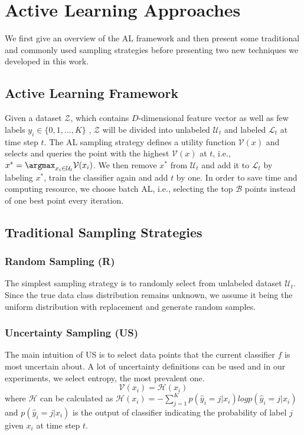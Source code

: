 \section{Active Learning Approaches}
\label{sec:approach}
We first give an overview of the AL framework and then present some 
traditional and commonly used sampling strategies before presenting 
two new techniques we developed in this work. 

\subsection{Active Learning Framework}
Given a dataset $ \mathcal{Z}$, which contains $D$-dimensional feature vector as well as few labels $y_i \in \{0,1,...,K\}$ , 
$\mathcal{Z}$ will be divided into unlabeled $\mathcal{U}_t$ and 
labeled $\mathcal{L}_t$ at time step $t$. 
The AL sampling strategy defines a utility function $\mathcal{V}(x)$ and selects and queries 
the point with the highest $\mathcal{V}(x)$ at $t$, i.e., $x^*=\argmax_{x_i\in\mathcal{U}_t}\mathcal{V}(x_i)$.
We then remove $x^*$ from $\mathcal{U}_t$ and 
add it to $\mathcal{L}_t$ by labeling $x^*$, train the classifier again and add $t$ by one. In order to save time and computing resource, we choose batch AL, i.e., selecting 
the top $\mathcal{B}$ points 
instead of one best point every iteration.


\subsection{Traditional Sampling Strategies}
\subsubsection{Random Sampling (R)}
The simplest sampling strategy is to randomly select from unlabeled dataset 
$\mathcal{U}_t$. Since the true data class distribution remains unknown, 
we assume it being the uniform distribution with replacement and generate random samples.

\subsubsection{Uncertainty Sampling (US)}
\label{sec:uncertainty}
The main intuition of US is to select data points that the current classifier $f$ 
is most uncertain about. A lot of uncertainty definitions can be used and 
in our experiments, we select entropy, the most prevalent one.
    \begin{equation}
        \mathcal{V}(x_i) =  \mathcal{H}(x_i)
    \end{equation}
    where $\mathcal{H}$ can be calculated as $ \mathcal{H}(x_i) = -\sum_{j=1}^K p(\hat{y}_i=j|x_i) log  p(\hat{y}_i=j|x_i)$ and $p(\hat{y}_i=j|x_i)$ is the output of classifier indicating the probability of label $j$ given $x_i$ at time step $t$.
    

